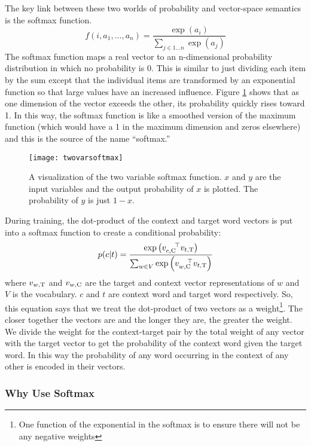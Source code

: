 The key link between these two worlds of probability and vector-space semantics
is the softmax function.
%
\[f(i, a_1,\dots, a_n)=\frac{\exp\left(a_i\right)}
{\sum_{j \in 1\dots{}n}\exp\left(a_j\right)}\]
%
The softmax function maps a real vector to an n-dimensional
probability distribution in which no probability is 0. This is similar to just
dividing each item by the sum except that the individual items are transformed
by an exponential function so that large values have an increased influence.
Figure \ref{fig:twovarsoftmax} shows that as one dimension of the vector 
exceeds the other, its probability quickly rises toward 1. In this way, the
softmax function is like a smoothed version of the maximum function (which would
have a 1 in the maximum dimension and zeros elsewhere) and this is the source
of the name ``softmax.''

\begin{figure}[tbp]
  \texttt{[image: twovarsoftmax]}
  \caption{A visualization of the two variable softmax function. $x$ and $y$
  are the input variables and the output probability of $x$ is plotted. The
  probability of $y$ is just $1-x$.}
  \label{fig:twovarsoftmax}
\end{figure}


During training, the dot-product of the context and target word vectors 
is put into a softmax function to create a conditional probability: 
%
\begin{equation}
  \label{eq:softmaxwithdotprod}
  p(c|t)=\frac{\exp\left(v_{c,\textrm{C}} ^{\quad\top} v_{t,\textrm{T}}\right)}
  {\sum_{w \in V}\exp\left(v_{w,\textrm{C}} ^{\quad\top} v_{t,\textrm{T}}\right)}
\end{equation}
%
where $v_{w,\textrm{T}}$ and $v_{w,\textrm{C}}$ are the target and context vector 
representations of $w$ and $V$ is the vocabulary. $c$ and $t$ are context word 
and target word respectively. So, this equation says that we 
treat the dot-product of two vectors as a weight\footnote{One function of the 
exponential in the softmax is to ensure there will not be any negative 
weights}. The closer together the vectors 
are and the longer they are, the greater the weight. We divide the weight for 
the context-target pair by the total weight of any vector with the target vector
to get the probability of the context word given the target word. In this way
the probability of any word occurring in the context of any other is encoded
in their vectors.

\subsubsection{Why Use Softmax}

